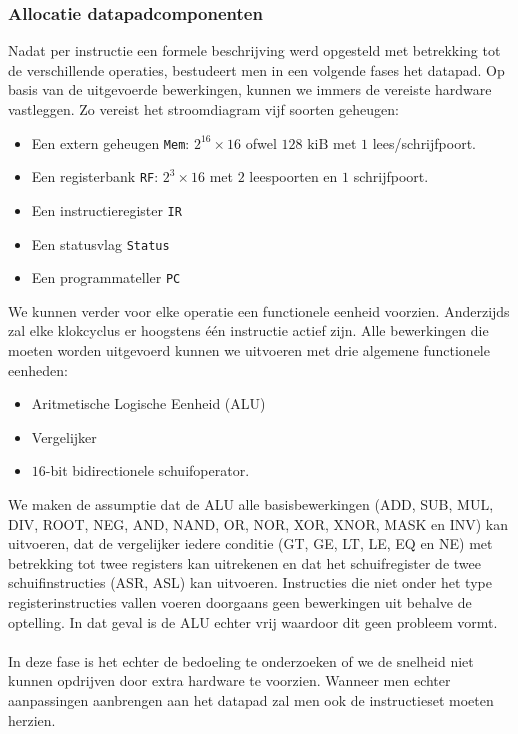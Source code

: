 \subsubsection{Allocatie datapadcomponenten}
Nadat per instructie een formele beschrijving werd opgesteld met betrekking tot de verschillende operaties, bestudeert men in een volgende fases het datapad. Op basis van de uitgevoerde bewerkingen, kunnen we immers de vereiste hardware vastleggen. Zo vereist het stroomdiagram vijf soorten geheugen:
\begin{itemize}
 \item 	Een extern geheugen \texttt{Mem}: $2^{16}\times 16$ ofwel $128\mbox{ kiB}$ met $1$ lees/schrijfpoort.
 \item Een registerbank \texttt{RF}: $2^3\times 16$ met $2$ leespoorten en $1$ schrijfpoort.
 \item Een instructieregister \texttt{IR}
 \item Een statusvlag \texttt{Status}
 \item Een programmateller \texttt{PC}
\end{itemize}
We kunnen verder voor elke operatie een functionele eenheid voorzien. Anderzijds zal elke klokcyclus er hoogstens \'e\'en instructie actief zijn. Alle bewerkingen die moeten worden uitgevoerd kunnen we uitvoeren met drie algemene functionele eenheden:
\begin{itemize}
 \item Aritmetische Logische Eenheid (ALU)
 \item Vergelijker
 \item $16$-bit bidirectionele schuifoperator.
\end{itemize}
We maken de assumptie dat de ALU alle basisbewerkingen (ADD, SUB, MUL, DIV, ROOT, NEG, AND, NAND, OR, NOR, XOR, XNOR, MASK en INV) kan uitvoeren, dat de vergelijker iedere conditie (GT, GE, LT, LE, EQ en NE) met betrekking tot twee registers kan uitrekenen en dat het schuifregister de twee schuifinstructies (ASR, ASL) kan uitvoeren. Instructies die niet onder het type registerinstructies vallen voeren doorgaans geen bewerkingen uit behalve de optelling. In dat geval is de ALU echter vrij waardoor dit geen probleem vormt.
\paragraph{}
In deze fase is het echter de bedoeling te onderzoeken of we de snelheid niet kunnen opdrijven door extra hardware te voorzien. Wanneer men echter aanpassingen aanbrengen aan het datapad zal men ook de instructieset moeten herzien.
